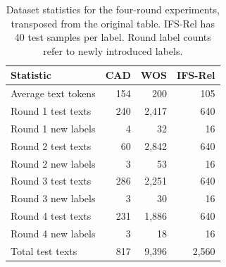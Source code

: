 \begin{table}[tbp]
\centering
\caption{Dataset statistics for the four-round experiments, transposed from the original table. IFS-Rel has 40 test samples per label. Round label counts refer to newly introduced labels.}
\label{tab:gorag:dataset}
\small
\begin{tabular}{lrrr}
\hline
Statistic & CAD & WOS & IFS-Rel\\
\hline
Average text tokens & 154 & 200 & 105 \\
Round 1 test texts & 240 & 2,417 & 640 \\
Round 1 new labels & 4 & 32 & 16 \\
Round 2 test texts & 60 & 2,842 & 640 \\
Round 2 new labels & 3 & 53 & 16 \\
Round 3 test texts & 286 & 2,251 & 640 \\
Round 3 new labels & 3 & 30 & 16 \\
Round 4 test texts & 231 & 1,886 & 640 \\
Round 4 new labels & 3 & 18 & 16 \\
Total test texts & 817 & 9,396 & 2,560 \\
\hline
\end{tabular}
\end{table}
